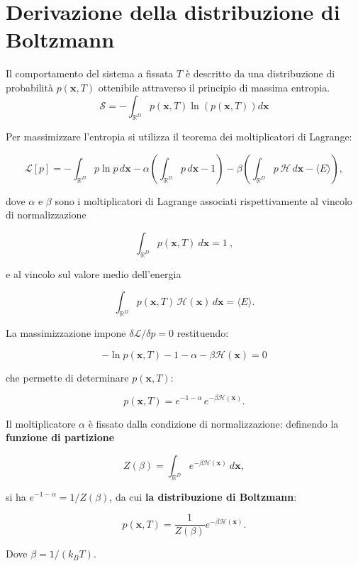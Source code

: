 \appendix

\chapter{Derivazione della distribuzione di Boltzmann}
\label{sec:a_boltzm_der}
Il comportamento del sistema a fissata $T$ è descritto da una distribuzione di probabilità $p (\mathbf{x}, T)$ ottenibile attraverso il principio di massima entropia.
\begin{equation}
    \mathcal{S} = - \int_{\mathbb{R}^D} p (\mathbf{x}, T) \ln(p(\mathbf{x}, T)) d\mathbf{x}
\end{equation}

Per massimizzare l'entropia si utilizza il teorema dei moltiplicatori di Lagrange:

\begin{equation}
    \mathcal{L}[p] = -\int_{\mathbb{R}^D} p \ln p \, d\mathbf{x} - \alpha \left( \int_{\mathbb{R}^D} p \, d\mathbf{x} - 1 \right) - \beta \left( \int_{\mathbb{R}^D} p \, \mathcal{H} \, d\mathbf{x} - \langle E \rangle \right),
\end{equation}

dove $\alpha$ e $\beta$ sono i moltiplicatori di Lagrange associati rispettivamente al vincolo di normalizzazione

\begin{equation}
    \int_{\mathbb{R}^D} p(\mathbf{x}, T) \ d\mathbf{x} = 1 \ ,
\end{equation}

e al vincolo sul valore medio dell'energia

\begin{equation}
    \int_{\mathbb{R}^D} p(\mathbf{x}, T) \, \mathcal{H}(\mathbf{x}) \, d\mathbf{x} = \langle E \rangle .
\end{equation}

La massimizzazione impone $\delta \mathcal{L}/\delta p = 0$ restituendo:

\begin{equation}
    - \ln p(\mathbf{x}, T) - 1 - \alpha - \beta \mathcal{H}(\mathbf{x}) = 0
\end{equation}

che permette di determinare $p (\mathbf{x}, T)$:

\begin{equation}
    p(\mathbf{x}, T) = e^{-1-\alpha} \, e^{-\beta \mathcal{H}(\mathbf{x})}.
\end{equation}

Il moltiplicatore $\alpha$ è fissato dalla condizione di normalizzazione: definendo la \textbf{funzione di partizione}

\begin{equation}
    Z(\beta) = \int_{\mathbb{R}^D} e^{-\beta \mathcal{H}(\mathbf{x})} \ d\mathbf{x},
\end{equation}

si ha $e^{-1-\alpha} = 1/Z(\beta)$, da cui \textbf{la distribuzione di Boltzmann}:

\begin{equation}
    p(\mathbf{x}, T) = \frac{1}{Z(\beta)} e^{-\beta \mathcal{H}(\mathbf{x})}.
\end{equation}

Dove $\beta = 1/(k_B T)$.
